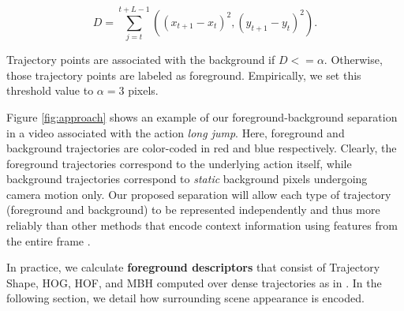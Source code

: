 
\begin{equation}
D = \sum _{j=t}^{t+L-1}\left ( (x_{t+1}-x_t)^2, (y_{t+1}-y_t)^2 \right ).
\end{equation}

Trajectory points are associated with the background if $D<=\alpha$. Otherwise, those trajectory points are labeled as foreground. Empirically, we set this threshold value to $\alpha=3$ pixels.

Figure \ref{fig:approach} shows an example of our foreground-background separation in a video associated with the action \textit{long jump}. Here, foreground and background trajectories are color-coded in red and blue respectively. Clearly, the foreground trajectories correspond to the underlying action itself, while background trajectories correspond to \emph{static} background pixels undergoing camera motion only. Our proposed separation will allow each type of trajectory (foreground and background) to be represented independently and thus more reliably than other methods that encode context information using features from the entire frame \cite{marszalek2009}.

In practice, we calculate \textbf{foreground descriptors} that consist of Trajectory Shape, HOG, HOF, and MBH computed over dense trajectories as in \cite{wang2013}. In the following section, we detail how surrounding scene appearance is encoded.


